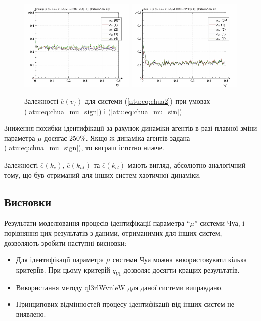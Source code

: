 \begin{figure}[htb!]
  \centerline{
    \includegraphics[width=0.49\textwidth]{p/cha/chua/ql3rlWvnAAW/chua_id-p_v_f_sign.png}
    \hfill
    \includegraphics[width=0.49\textwidth]{p/cha/chua/ql3rlWvnAAW/chua_id-p_v_f_sin.png}
  }
\caption{Залежності $ \overline{e} (v_f) $ для системи (\ref{atu:eq:chua2}) при умовах (\ref{atu:eq:chua_mu_sign}) і (\ref{atu:eq:chua_mu_sin})}
\label{atu:f:chua_e_v_f}
\end{figure}

Зниження похибки ідентифікації за рахунок динаміки агентів в
разі плавної зміни параметра
$ \mu $ досягає 250\%. Якщо ж динаміка агентів задана (\ref{atu:eq:chua_mu_sign}),
то виграш істотно нижче.

Залежності
$\overline{e}(k_e)$,
$\overline{e}(k_{nl})$ та
$\overline{e}(k_{cl})$
мають вигляд, абсолютно аналогічний тому, що був отриманий для
інших систем хаотичної динаміки.





\subsection{Висновки} %

Результати моделювання процесів ідентифікації параметра ``$\mu$''
системи Чуа, і порівняння цих результатів з даними, отриманимих
для інших систем, дозволяють зробити наступні висновки:

\begin{itemize}

  \item
    Для ідентифікації параметра
    $ \mu $ системи Чуа можна використовувати кілька критеріїв. При
    цьому критерій
    $ q_{V1} $ дозволяє досягти кращих результатів.

  \item
    Використання методу ql3rlWvnleW для даної системи виправдано.

  \item
    Принципових відмінностей процесу ідентифікації від інших
    систем не виявлено.

\end{itemize}





